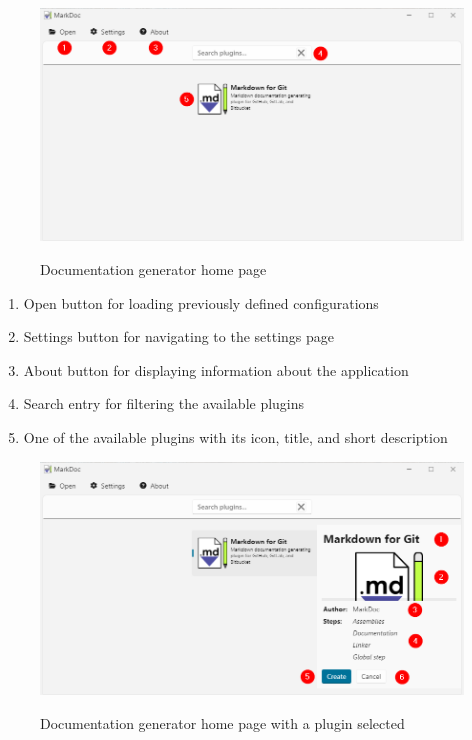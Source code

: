 \begin{figure}[H]
    \includegraphics[width=\linewidth]{img/markDocHomePage.png}
    \label{fig:homePage}
    \caption{Documentation generator home page}
\end{figure}

\begin{enumerate}
    \item Open button for loading previously defined configurations
    \item Settings button for navigating to the settings page
    \item About button for displaying information about the application
    \item Search entry for filtering the available plugins
    \item One of the available plugins with its icon, title, and short description
\end{enumerate}

\begin{figure}[H]
    \includegraphics[width=\linewidth]{img/markDocPluginSelected.png}
    \label{fig:homePagePluginSelected}
    \caption{Documentation generator home page with a plugin selected}
\end{figure}

